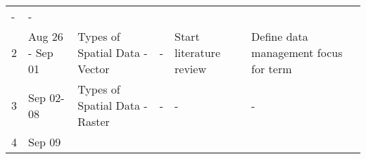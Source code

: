\documentclass[
]{article}
\begin{document}
\begin{longtable}[]{@{}llllll@{}}
\begin{minipage}[t]{0.14\columnwidth}
-\strut
\end{minipage} & \begin{minipage}[t]{0.17\columnwidth}\raggedright
-\strut
\end{minipage}\tabularnewline
\begin{minipage}[t]{0.05\columnwidth}\raggedright
2\strut
\end{minipage} & \begin{minipage}[t]{0.11\columnwidth}\raggedright
Aug 26 - Sep 01\strut
\end{minipage} & \begin{minipage}[t]{0.18\columnwidth}\raggedright
Types of Spatial Data - Vector\strut
\end{minipage} & \begin{minipage}[t]{0.18\columnwidth}\raggedright
-\strut
\end{minipage} & \begin{minipage}[t]{0.14\columnwidth}\raggedright
Start literature review\strut
\end{minipage} & \begin{minipage}[t]{0.17\columnwidth}\raggedright
Define data management focus for term\strut
\end{minipage}\tabularnewline
\begin{minipage}[t]{0.05\columnwidth}\raggedright
3\strut
\end{minipage} & \begin{minipage}[t]{0.11\columnwidth}\raggedright
Sep 02-08\strut
\end{minipage} & \begin{minipage}[t]{0.18\columnwidth}\raggedright
Types of Spatial Data - Raster\strut
\end{minipage} & \begin{minipage}[t]{0.18\columnwidth}\raggedright
-\strut
\end{minipage} & \begin{minipage}[t]{0.14\columnwidth}\raggedright
-\strut
\end{minipage} & \begin{minipage}[t]{0.17\columnwidth}\raggedright
-\strut
\end{minipage}\tabularnewline
\begin{minipage}[t]{0.05\columnwidth}\raggedright
4\strut
\end{minipage} & \begin{minipage}[t]{0.11\columnwidth}\raggedright
Sep 09\strut
\end{minipage} & \begin{minipage}[t]{0.18\columnwidth}\raggedright

\end{minipage}
\end{longtable}
\end{document}
